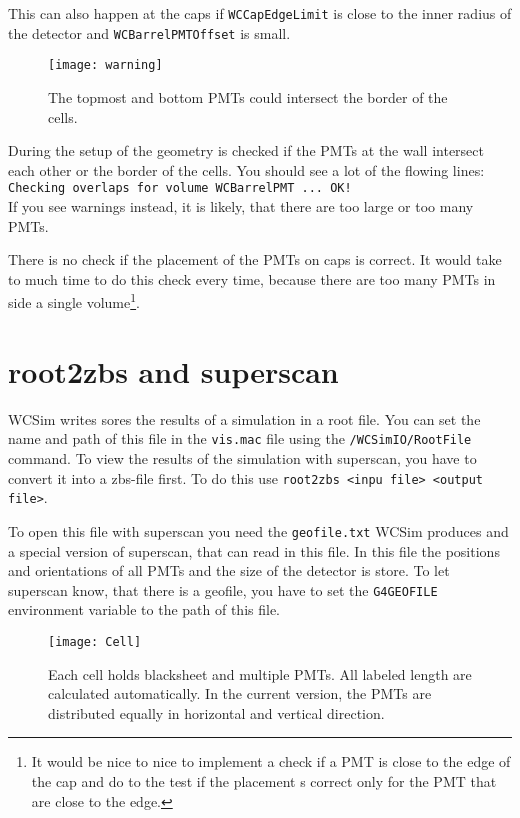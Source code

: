 This can also happen at the caps if \texttt{WCCapEdgeLimit} is close to the inner radius of the detector and \texttt{WCBarrelPMTOffset} is small.

\begin{figure}
  \begin{center}
\texttt{[image: warning]}
  \end{center}
\caption{The topmost and bottom PMTs could  intersect the border of the cells.} \label{fig:warning}
\end{figure}

During the setup of the geometry is checked if the PMTs at the wall intersect each other or the border of the cells. You should see a lot of the flowing lines:\\
\texttt{Checking overlaps for volume WCBarrelPMT ... OK!}\\
If you see warnings instead, it is likely, that there are too large or too many PMTs.

There is no check if the placement of the PMTs on caps is correct. It would take to much time to do this check every time, because there are too many PMTs in side a single volume\footnote{It would be nice to nice to implement a check if a PMT is close to the edge of the cap and do to the test if the placement s correct only for the PMT that are close to the edge.}. 
 
 


\section{root2zbs and superscan}
WCSim writes sores the results of a simulation in a root file. You can set the name and path of this file in the \texttt{vis.mac} file using the \texttt{/WCSimIO/RootFile} command. To view the results of the simulation with superscan, you have to convert it into a zbs-file first. To do this use \texttt{root2zbs <inpu file> <output file>}.

To open this file with superscan you need the \texttt{geofile.txt} WCSim produces and a special version of superscan, that can read in this file. In this file the positions and orientations of all PMTs and the size of the detector is store. To let superscan know, that there is a geofile, you have to set the \texttt{G4GEOFILE} environment variable to the path of this file.


\begin{figure}
  \begin{center}
\texttt{[image: Cell]}
  \end{center}
\caption{Each cell holds blacksheet and multiple PMTs. All labeled length are calculated automatically. In the current version, the PMTs are distributed equally in horizontal and vertical direction.}
\end{figure}

